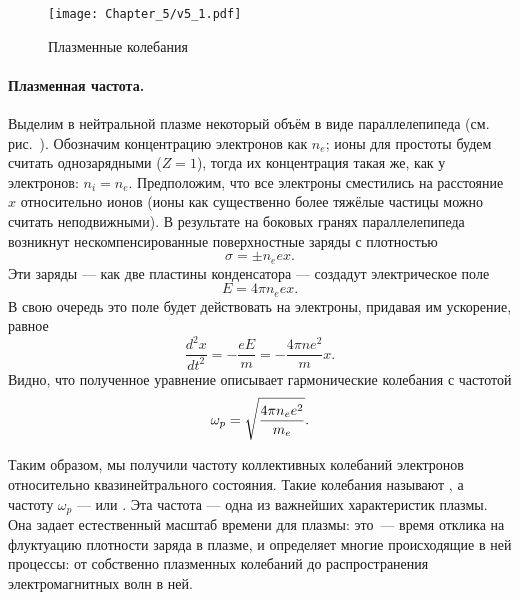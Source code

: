 \begin{figure}
    \centering
    \texttt{[image: Chapter\_5/v5\_1.pdf]}
    \caption{Плазменные колебания}
\end{figure}

\paragraph{Плазменная частота.}
Выделим в нейтральной плазме некоторый объём в виде параллелепипеда
(см. рис.~).
Обозначим концентрацию электронов как $n_e$; ионы для простоты будем считать
однозарядными ($Z=1$), тогда их концентрация такая же, как у электронов: $n_i=n_e$.
Предположим, что все электроны сместились на расстояние $x$ относительно ионов
(ионы как существенно более тяжёлые частицы можно считать неподвижными).
В результате на боковых гранях параллелепипеда возникнут нескомпенсированные
поверхностные заряды с плотностью
\begin{equation*}
    \sigma = \pm n_e e x.
\end{equation*}
Эти заряды --- как две пластины конденсатора --- создадут электрическое поле
\begin{equation*}
    E=4\pi n_e e x.
\end{equation*}
В свою очередь это поле будет действовать на электроны,
придавая им ускорение, равное
\begin{equation*}
    \frac{d^2x}{dt^2}=-\frac{eE}{m}=-\frac{4\pi ne^2}{m}x.
\end{equation*}
Видно, что полученное уравнение описывает гармонические колебания с частотой
\begin{equation}
    \eqmark{plasma-freq}
    \omega_p=\sqrt{\frac{4\pi n_e e^2}{m_e}}.
\end{equation}

Таким образом, мы получили частоту коллективных колебаний
электронов относительно квазинейтрального состояния. Такие колебания
называют , а частоту $\omega_p$ ---
 или . Эта частота ---
одна из важнейших характеристик плазмы.
Она задает естественный масштаб времени для плазмы: это~--- время
отклика на флуктуацию плотности заряда в плазме,
и определяет многие происходящие в ней процессы: от собственно плазменных
колебаний до распространения электромагнитных волн в ней.

